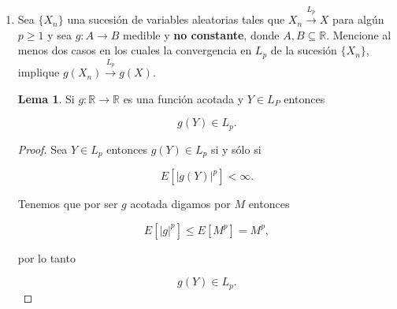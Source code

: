 \documentclass[letterpaper]{article}
\theoremstyle{definition}
\theoremstyle{lemathm}
\newtheorem{lema}{Lema}
\theoremstyle{lemademthm}
\newcommand{\limninf}{\lim_{n\to\infty}}
\newcommand{\abs}[1]{\left| #1 \right| }
\newcommand{\bracs}[1]{\left[ #1 \right] }
\newcommand{\set}[1]{\left \{ #1 \right\} }
\newcommand{\R}{\mathbb{R}}
\newcommand{\1}{\mathbbm{1}}
\begin{document}
\begin{enumerate}
\begin{enumerate}
\begin{proof}
				por continuidad del valor absoluto y de $x^p$ tenemos que

				\[\limninf E[|X_n-Y|^p] = E[|Y-Y|^p] = 0,\]
		
				por lo tanto converge también en $L_p$.
			\end{proof}

			\newpage
			
			\item Escriba la definición de $X_n\to\infty$ en probabilidad.
			
			Sea $\set{X_n}$ y $X$ definidas sobre $(\Omega, \mathcal{F}, \mathbb{P})$.$X_n$ diverge en probabilidad si y sólo si para todo $\epsilon > 0$
				
			\[\limninf \mathbb{P}\bracs{X_n > \epsilon} = 1.\]

			Esto es denotado por
			
			\[X_n \xrightarrow{P} \infty.\]

		\end{enumerate}

		\newpage
		
		\item Sea $\{X_n\}$ una sucesión de variables aleatorias tales que $X_n\overset{L_p}{\to} X$ para algún $p\geq 1$ y sea $g:A\to B$ medible y \textbf{no constante}, donde $A,B\subseteq \R$. Mencione al menos dos casos en los cuales la convergencia en $L_p$ de la sucesión $\{X_n\}$, implique $g(X_n)\overset{L_p}{\to} g(X)$.

		\begin{lema}

			Si $g: \R \rightarrow \R$ es una función acotada y $Y \in L_P$ entonces

			\[g(Y) \in L_p.\]
			
		\end{lema}
		
		\begin{proof}
			Sea $Y \in L_p$ entonces $g(Y) \in L_p$ si y sólo si

			\[E[\abs{g(Y)}^p] < \infty.\]

			Tenemos que por ser $g$ acotada digamos por $M$ entonces

			\[E[\abs{g}^p] \leq E[M^p] = M^p,\]

			por lo tanto

			\[g(Y) \in L_p.\]

		\end{proof}

		\begin{itemize}


\end{itemize}
\end{enumerate}
\end{document}
